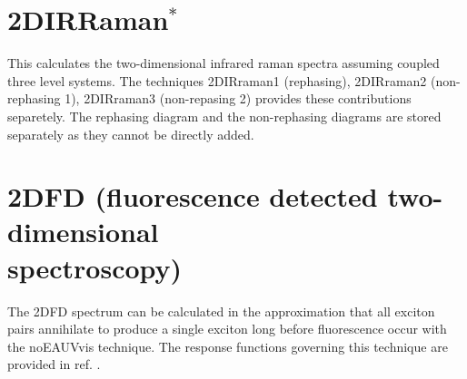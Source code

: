 \section{2DIRRaman$^{*}$}
This calculates the two-dimensional infrared raman spectra assuming coupled three level systems. The techniques 2DIRraman1 (rephasing), 2DIRraman2 (non-rephasing 1), 2DIRraman3 (non-repasing 2) provides these contributions separetely. The rephasing diagram and the non-rephasing diagrams are stored separately as they cannot be directly added. %
\section{2DFD (fluorescence detected two-dimensional\\ spectroscopy)}
 The 2DFD spectrum can be calculated in the approximation that all exciton pairs annihilate to produce a single exciton long before fluorescence occur with the noEAUVvis technique. The response functions governing this technique are provided in ref. \cite{Kunsel_2018}.
